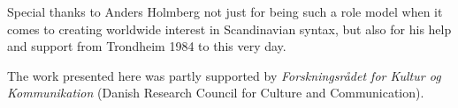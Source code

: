 \documentclass[output=paper]{LSP/langsci}
\begin{document}
Special thanks to Anders Holmberg not just for being such a role model when it comes to creating worldwide interest in {Scandinavian} syntax, but also for his help and support from  Trondheim 1984 to this very day. 

The work presented here was partly supported by \textit{Forskningsrådet for Kultur og Kommunikation} ({Danish} Research Council for Culture and Communication).
 
 

\printbibliography[heading=subbibliography,notkeyword=this]
\end{document}
